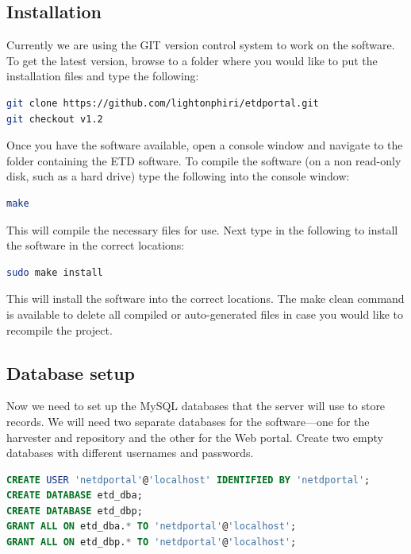 \documentclass[a4paper,11pt]{article}
\begin{document}
\subsection{Installation}
\label{sec:installation_process:installation}

Currently we are using the GIT version control system to work on the software. To get the latest version, browse to a folder where you would like to put the installation files and type the following:

\begin{lstlisting}[language=bash]
git clone https://github.com/lightonphiri/etdportal.git 
git checkout v1.2
\end{lstlisting}

Once you have the software available, open a console window and navigate to the folder containing the ETD software. To compile the software (on a non read-only disk, such as a hard drive) type the following into the console window: 

\begin{lstlisting}[language=bash]
make
\end{lstlisting}

This will compile the necessary files for use. Next type in the following to install the software in the correct locations: 

\begin{lstlisting}[language=bash]
sudo make install
\end{lstlisting}

This will install the software into the correct locations. The make clean command is available to delete all compiled or auto-generated files in case you would like to recompile the project.

\subsection{Database setup}
\label{sec:installation_process:database_setup}

Now we need to set up the MySQL databases that the server will use to store records. We will need two separate databases for the software---one for the harvester and repository and the other for the Web portal. Create two empty databases with different usernames and passwords. 

\begin{lstlisting}[language=SQL]
CREATE USER 'netdportal'@'localhost' IDENTIFIED BY 'netdportal'; 
CREATE DATABASE etd_dba; 
CREATE DATABASE etd_dbp; 
GRANT ALL ON etd_dba.* TO 'netdportal'@'localhost';
GRANT ALL ON etd_dbp.* TO 'netdportal'@'localhost';
\end{lstlisting}
\end{document}
